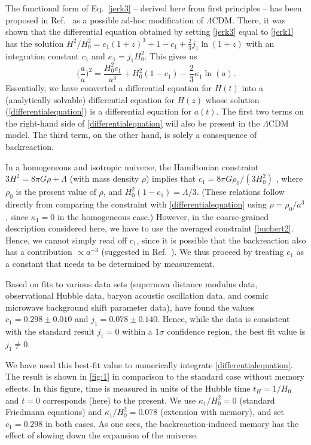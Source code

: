 \documentclass[aps,prl,11pt,nofootinbib]{revtex4-1}
\begin{document}
The functional form of Eq.\ \eqref{jerk3} -- derived here from first principles -- has been proposed in Ref.\ \cite{MukherjeeB2016} as a possible ad-hoc modification of $\Lambda${\sc CDM}. There, it was shown that the differential equation obtained by setting \cref{jerk3} equal to \cref{jerk1} has the solution $H^2/H_0^2 = c_1(1+z)^3+1-c_1 +\frac{2}{3} j_1 \ln(1+z)$ with an integration constant $c_1$ and $\kappa_1 = j_1 H_0^2$. This gives us 
\begin{equation}
\bigg(\frac{\dot{a}}{a}\bigg)^2 = \frac{H_0^2 c_1}{a^3} + H_0^2(1-c_1) - \frac{2}{3}\kappa_1\ln(a).
\label{differentialequation}%
\end{equation}
Essentially, we have converted a differential equation for $H(t)$ into a (analytically solvable) differential equation for $H(z)$ whose solution (\cref{differentialequation}) is a differential equation for $a(t)$.  The first two terms on the right-hand side of \cref{differentialequation} will also be present in the $\Lambda${CDM} model. The third term, on the other hand, is solely a consequence of backreaction. 

In a homogeneous and isotropic universe, the Hamiltonian constraint $3H^2=8\pi G \rho + \Lambda$ (with mass density $\rho$) implies that $c_1 = 8\pi G \rho_0/(3 H_0^2)$ \cite{MukherjeeB2016}, where $\rho_0$ is the present value of $\rho$, and $H_0^2(1-c_1) = \Lambda/3$. (These relations follow directly from comparing the constraint with \cref{differentialequation} using $\rho = \rho_0/a^3$, since $\kappa_1 = 0$ in the homogeneous case.) However, in the coarse-grained description considered here, we have to use the averaged constraint \eqref{buchert2}. Hence, we cannot simply read off $c_1$, since it is possible that the backreaction also has a contribution $\propto a^{-3}$ (suggested in Ref.\ \cite{Buchert2005}). We thus proceed by treating $c_1$ as a constant that needs to be determined by measurement. 

Based on fits to various data sets (supernova distance modulus data, observational Hubble data, baryon acoustic oscillation data, and cosmic microwave background shift parameter data), \citet{MukherjeeB2016} have found the values $c_1 = 0.298 \pm 0.010$ and $j_1 = 0.078 \pm 0.140$. Hence, while the data is consistent with the standard result $j_1 = 0$ within a $1\sigma$ confidence region, the best fit value is $j_1 \neq 0$.  

We have used this best-fit value to numerically integrate \cref{differentialequation}. The result is shown in \cref{fig:1} in comparison to the standard case without memory effects. In this figure, time is measured in units of the Hubble time $t_H = 1/H_0$ and $t=0$ corresponds (here) to the present. We use $\kappa_1/H_0^2 =0$ (standard Friedmann equations) and $\kappa_1/H_0^2 = 0.078$ (extension with memory), and set $c_1 = 0.298$ in both cases. As one sees, the backreaction-induced memory has the effect of slowing down the expansion of the universe.  
\end{document}
